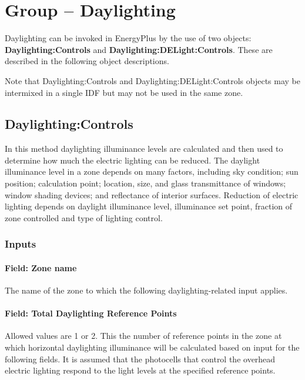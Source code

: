 \section{Group -- Daylighting}\label{group-daylighting}

Daylighting can be invoked in EnergyPlus by the use of two objects: \textbf{Daylighting:Controls} and \textbf{Daylighting:DELight:Controls}. These are described in the following object descriptions.

\begin{callout}
  Note that Daylighting:Controls and Daylighting:DELight:Controls objects may be intermixed in a single IDF but may not be used in the same zone.
\end{callout}

\subsection{Daylighting:Controls}\label{daylightingcontrols-000}

In this method daylighting illuminance levels are calculated and then used to determine how much the electric lighting can be reduced. The daylight illuminance level in a zone depends on many factors, including sky condition; sun position; calculation point; location, size, and glass transmittance of windows; window shading devices; and reflectance of interior surfaces. Reduction of electric lighting depends on daylight illuminance level, illuminance set point, fraction of zone controlled and type of lighting control.

\subsubsection{Inputs}\label{inputs-009}

\paragraph{Field: Zone name}\label{field-zone-name-003}

The name of the zone to which the following daylighting-related input applies.

\paragraph{Field: Total Daylighting Reference Points}\label{field-total-daylighting-reference-points}

Allowed values are 1 or 2. This the number of reference points in the zone at which horizontal daylighting illuminance will be calculated based on input for the following fields. It is assumed that the photocells that control the overhead electric lighting respond to the light levels at the specified reference points.

